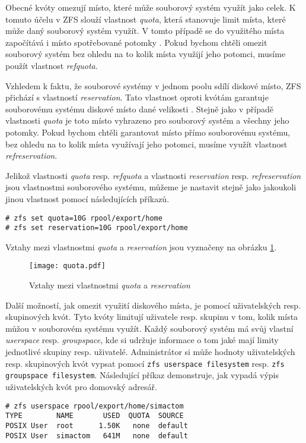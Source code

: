 Obecné kvóty omezují místo, které může souborový systém využít jako celek. K tomuto účelu v ZFS slouží vlastnost \emph{quota}, která stanovuje limit místa, které může daný souborový systém využít. V tomto případě se do využitého místa započítává i místo spotřebované potomky \cite{quotas}. Pokud bychom chtěli omezit souborový systém bez ohledu na to kolik místa využijí jeho potomci, musíme použít vlastnost \emph{refquota}.

Vzhledem k faktu, že souborové systémy v jednom poolu sdílí diskové místo, ZFS přichází s vlastností \emph{reservation}. Tato vlastnost oproti kvótám garantuje souborovému systému diskové místo dané velikosti \cite{quotas}. Stejně jako v případě vlastnosti \emph{quota} je toto místo vyhrazeno pro souborový systém a všechny jeho potomky. Pokud bychom chtěli garantovat místo přímo souborovému systému, bez ohledu na to kolik místa využívají jeho potomci, musíme využít vlastnost \emph{refreservation}.

Jelikož vlastnosti \emph{quota} resp. \emph{refquota} a vlastnosti \emph{reservation} resp. \emph{refreservation} jsou vlastnostmi souborového systému, můžeme je nastavit stejně jako jakoukoli jinou vlastnost pomocí následujících příkazů.
\begin{verbatim}
# zfs set quota=10G rpool/export/home
# zfs set reservation=10G rpool/export/home
\end{verbatim}

Vztahy mezi vlastnostmi \emph{quota} a \emph{reservation} jsou vyznačeny na obrázku \ref{quotavsreserv}.
\begin{figure}[h]
    \caption{Vztahy mezi vlastnostmi \emph{quota} a \emph{reservation}}
    \label{quotavsreserv}
    \centering
    \texttt{[image: quota.pdf]}
\end{figure}

Další možností, jak omezit využití diskového místa, je pomocí uživatelských resp. skupinových kvót. Tyto kvóty limitují uživatele resp. skupinu v tom, kolik místa můžou v souborovém systému využít. Každý souborový systém má svůj vlastní \emph{userspace} resp. \emph{groupspace}, kde si udržuje informace o tom jaké mají limity jednotlivé skupiny resp. uživatelé.
Administrátor si může hodnoty uživatelských resp. skupinových kvót vypsat pomocí \verb|zfs userspace filesystem| resp. \verb|zfs groupspace filesystem|. Následující příkaz demonstruje, jak vypadá výpis uživatelských kvót pro domovský adresář.
\begin{verbatim}
# zfs userspace rpool/export/home/simactom
TYPE        NAME       USED  QUOTA  SOURCE
POSIX User  root      1.50K   none  default
POSIX User  simactom   641M   none  default
\end{verbatim}

